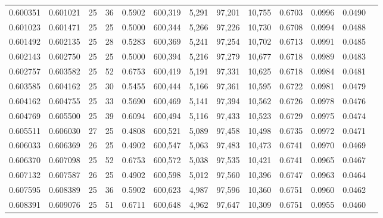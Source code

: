 \begin{tabular}{rrrrrrrrrrrrr}
0.600351 & 0.601021 &    25 &  36 &                                     0.5902 & 600,319 &   5,291 &  97,201 &  10,755 & 0.6703 & 0.0996 & 0.0490 \\
0.601023 & 0.601471 &    25 &  25 &                                     0.5000 & 600,344 &   5,266 &  97,226 &  10,730 & 0.6708 & 0.0994 & 0.0488 \\
0.601492 & 0.602135 &    25 &  28 &                                     0.5283 & 600,369 &   5,241 &  97,254 &  10,702 & 0.6713 & 0.0991 & 0.0485 \\
0.602143 & 0.602750 &    25 &  25 &                                     0.5000 & 600,394 &   5,216 &  97,279 &  10,677 & 0.6718 & 0.0989 & 0.0483 \\
0.602757 & 0.603582 &    25 &  52 &                                     0.6753 & 600,419 &   5,191 &  97,331 &  10,625 & 0.6718 & 0.0984 & 0.0481 \\
0.603585 & 0.604162 &    25 &  30 &                                     0.5455 & 600,444 &   5,166 &  97,361 &  10,595 & 0.6722 & 0.0981 & 0.0479 \\
0.604162 & 0.604755 &    25 &  33 &                                     0.5690 & 600,469 &   5,141 &  97,394 &  10,562 & 0.6726 & 0.0978 & 0.0476 \\
0.604769 & 0.605500 &    25 &  39 &                                     0.6094 & 600,494 &   5,116 &  97,433 &  10,523 & 0.6729 & 0.0975 & 0.0474 \\
0.605511 & 0.606030 &    27 &  25 &                                     0.4808 & 600,521 &   5,089 &  97,458 &  10,498 & 0.6735 & 0.0972 & 0.0471 \\
0.606033 & 0.606369 &    26 &  25 &                                     0.4902 & 600,547 &   5,063 &  97,483 &  10,473 & 0.6741 & 0.0970 & 0.0469 \\
0.606370 & 0.607098 &    25 &  52 &                                     0.6753 & 600,572 &   5,038 &  97,535 &  10,421 & 0.6741 & 0.0965 & 0.0467 \\
0.607132 & 0.607587 &    26 &  25 &                                     0.4902 & 600,598 &   5,012 &  97,560 &  10,396 & 0.6747 & 0.0963 & 0.0464 \\
0.607595 & 0.608389 &    25 &  36 &                                     0.5902 & 600,623 &   4,987 &  97,596 &  10,360 & 0.6751 & 0.0960 & 0.0462 \\
0.608391 & 0.609076 &    25 &  51 &                                     0.6711 & 600,648 &   4,962 &  97,647 &  10,309 & 0.6751 & 0.0955 & 0.0460 \\

\end{tabular}

